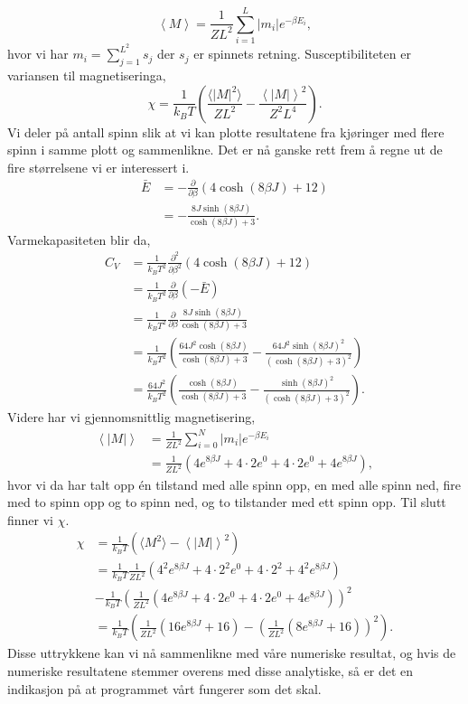 \documentclass[norsk, 10pt]{article}
\def\mean#1{\left\langle #1 \right\rangle}
\def\para#1{\left( #1 \right)}
\begin{document}
$$ \mean M = \frac{1}{ZL^2}\sum\limits_{i=1}^{L} |m_i|e^{-\beta E_i},$$
hvor vi har $m_i = \sum_{j=1}^{L^2} s_j$ der $s_j$ er spinnets retning. Susceptibiliteten er variansen til magnetiseringa,
$$ \chi = \frac{1}{k_BT}\para{\frac{\langle |M|^2\rangle}{ZL^2} - \frac{\mean{|M|}^2}{Z^2L^4}}.$$
Vi deler på antall spinn slik at vi kan plotte resultatene fra kjøringer med flere spinn i samme plott og sammenlikne. Det er nå ganske rett frem å regne ut de fire størrelsene vi er interessert i.
\begin{align*}
	\bar E &= -\frac{\partial}{\partial \beta} (4\cosh(8\beta J) + 12) \\
	&= -\frac{8J\sinh(8\beta J)}{\cosh(8\beta J) + 3}.
\end{align*}
Varmekapasiteten blir da,
\begin{align*}
	C_V &= \frac{1}{k_BT^2}\frac{\partial^2}{\partial \beta^2} (4\cosh(8\beta J) + 12) \\
	&= \frac{1}{k_BT^2}\frac{\partial}{\partial \beta} (-\bar E) \\
	&= \frac{1}{k_BT^2}\frac{\partial}{\partial \beta}\frac{8J\sinh(8\beta J)}{\cosh(8\beta J) + 3} \\
	&= \frac{1}{k_BT^2}\para{\frac{64J^2\cosh(8\beta J)}{\cosh(8\beta J) + 3} - \frac{64J^2\sinh(8\beta J)^2}{(\cosh(8\beta J) + 3)^2}} \\
	&= \frac{64J^2}{k_BT^2}\para{\frac{\cosh(8\beta J)}{\cosh(8\beta J) + 3} - \frac{\sinh(8\beta J)^2}{(\cosh(8\beta J) + 3)^2}}.
\end{align*}
Videre har vi gjennomsnittlig magnetisering,
\begin{align*}
	\mean{|M|} &= \frac{1}{ZL^2}\sum\limits_{i=0}^N |m_i|e^{-\beta E_i} \\
	&= \frac{1}{ZL^2}\para{4e^{8\beta J} + 4\cdot 2e^{0} + 4\cdot 2e^{0} + 4e^{8\beta J}},
\end{align*}
hvor vi da har talt opp én tilstand med alle spinn opp, en med alle spinn ned, fire med to spinn opp og to spinn ned, og to tilstander med ett spinn opp. Til slutt finner vi $\chi$.
\begin{align*}
	\chi &= \frac{1}{k_BT}\para{\langle M^2\rangle - \mean{|M|}^2} \\
	&= \frac{1}{k_BT}\frac{1}{ZL^2}\para{4^2e^{8\beta J} + 4\cdot2^2e^0 + 4\cdot2^2 + 4^2e^{8\beta J}} \\
	&- \frac{1}{k_BT}\para{ \frac{1}{ZL^2}\para{4e^{8\beta J} + 4\cdot 2e^{0} + 4\cdot 2e^{0} + 4e^{8\beta J}}}^2 \\
	&= \frac{1}{k_BT}\para{\frac{1}{ZL^2}\para{16e^{8\beta J} + 16} - \para{ \frac{1}{ZL^2}\para{8e^{8\beta J} + 16}}^2}.
\end{align*}
Disse uttrykkene kan vi nå sammenlikne med våre numeriske resultat, og hvis de numeriske resultatene stemmer overens med disse analytiske, så er det en indikasjon på at programmet vårt fungerer som det skal.
\end{document}
